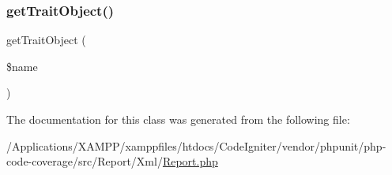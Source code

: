 \subsubsection{\texorpdfstring{get\+Trait\+Object()}{getTraitObject()}}
{\footnotesize\ttfamily get\+Trait\+Object (\begin{DoxyParamCaption}\item[{}]{\$name }\end{DoxyParamCaption})}



The documentation for this class was generated from the following file\+:\begin{DoxyCompactItemize}
\item 
/\+Applications/\+X\+A\+M\+P\+P/xamppfiles/htdocs/\+Code\+Igniter/vendor/phpunit/php-\/code-\/coverage/src/\+Report/\+Xml/\mbox{\hyperlink{_report_8php}{Report.\+php}}\end{DoxyCompactItemize}
